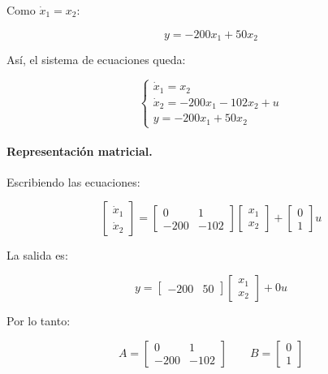 \documentclass[12pt,a4paper]{article}
\begin{document}
Como $\dot{x}_1=x_2$:

\begin{equation}\boxed{y=-200x_1+50x_2}\end{equation}

Así, el sistema de ecuaciones queda:

\begin{equation}\begin{cases}\dot{x}_1=x_2\\\dot{x}_2=-200x_1-102x_2+u\\y=-200x_1+50x_2\end{cases}\end{equation}
\paragraph{Representación matricial.} Escribiendo las ecuaciones:

\begin{equation}\begin{bmatrix}\dot{x}_1\\\dot{x}_2\end{bmatrix}=\begin{bmatrix}0&1\\-200&-102\end{bmatrix} \begin{bmatrix}x_1\\x_2\end{bmatrix}+\begin{bmatrix}0\\1\end{bmatrix}u\end{equation}

La salida es:

\begin{equation}y=\begin{bmatrix}-200&50\end{bmatrix} \begin{bmatrix}x_1\\x_2\end{bmatrix}+0u\end{equation}

Por lo tanto:

\begin{equation}\boxed{A=\begin{bmatrix}0&1\\-200&-102\end{bmatrix} \qquad B=\begin{bmatrix}0\\1\end{bmatrix}}\end{equation}
\end{document}
